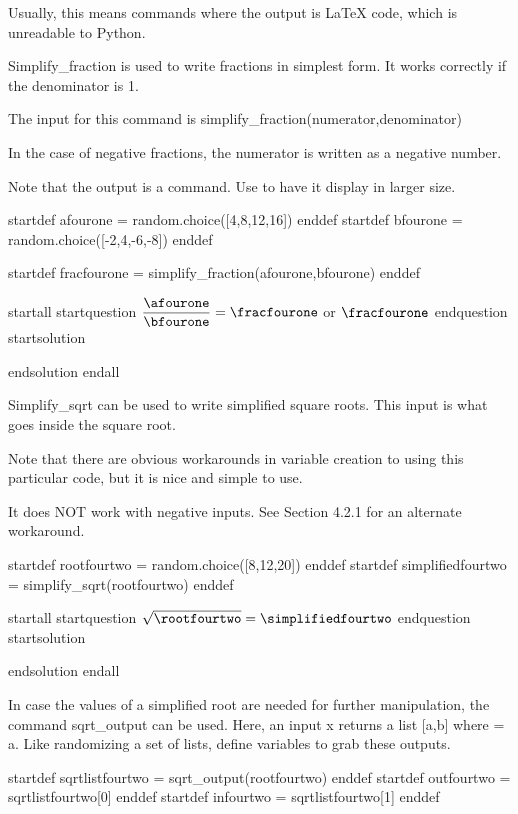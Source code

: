 Usually, this means commands where the output is LaTeX code, which is unreadable to Python.




Simplify_fraction is used to write fractions in simplest form. It works correctly if the denominator is 1. 

The input for this command is simplify_fraction(numerator,denominator)

In the case of negative fractions, the numerator is written as a negative number. 

Note that the output is a \frac command. Use \displaystyle to have it display in larger size.

startdef afourone = random.choice([4,8,12,16]) enddef
startdef bfourone = random.choice([-2,4,-6,-8]) enddef

startdef fracfourone = simplify_fraction(afourone,bfourone) enddef

startall
startquestion $\dfrac{\afourone}{\bfourone} = \fracfourone$ or $\displaystyle \fracfourone$ 
endquestion
startsolution \item  endsolution
endall




Simplify_sqrt can be used to write simplified square roots. This input is what goes inside the square root.

Note that there are obvious workarounds in variable creation to using this particular code, but it is nice and simple to use.

It does NOT work with negative inputs. See Section 4.2.1 for an alternate workaround.

startdef rootfourtwo = random.choice([8,12,20]) enddef
startdef simplifiedfourtwo = simplify_sqrt(rootfourtwo) enddef

startall
startquestion  $\sqrt{\rootfourtwo} = \simplifiedfourtwo$ endquestion
startsolution \item  endsolution
endall



In case the values of a simplified root are needed for further manipulation, the command sqrt_output can be used. Here, an input x returns a list [a,b] where  = a. Like randomizing a set of lists, define variables to grab these outputs.

startdef sqrtlistfourtwo = sqrt_output(rootfourtwo) enddef
startdef outfourtwo = sqrtlistfourtwo[0] enddef
startdef infourtwo = sqrtlistfourtwo[1] enddef

